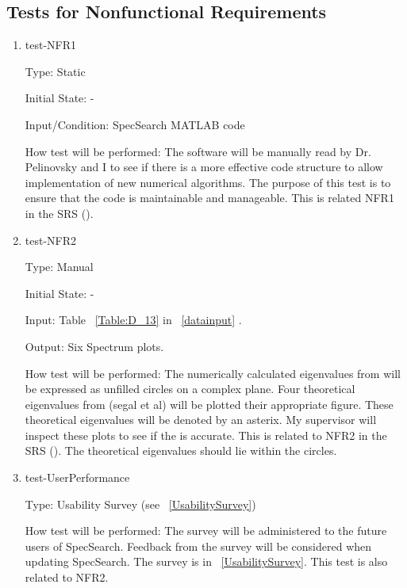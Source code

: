 \documentclass[12pt, titlepage]{article}
\begin{document}
\subsection{Tests for Nonfunctional Requirements}
\label{NFRtests}
\begin{enumerate}

\item{test-NFR1\\}

Type: Static
					
Initial State: -
					
Input/Condition: SpecSearch MATLAB code
					
How test will be performed: The software will be manually read by Dr. 
Pelinovsky and I to see if there is a more effective code structure to allow 
implementation of new numerical algorithms. The purpose of this test is to 
ensure that the code is maintainable and manageable. This is related NFR1 in 
the 
SRS (\cite{SRS}). 

\item{test-NFR2\\} 

Type: Manual 

Initial State: -

Input: Table ~\ref{Table:D_13} in ~\ref{datainput} .

Output: Six Spectrum plots.

How test will be performed: The numerically calculated eigenvalues from 
\progname will be expressed as unfilled circles on a complex plane. Four 
theoretical eigenvalues from (segal et al) will be plotted their appropriate 
figure. These theoretical eigenvalues will be denoted by an asterix. My 
supervisor will inspect these plots to see if the \progname is accurate. This 
is related to NFR2 in the SRS (\cite{SRS}). The theoretical eigenvalues should 
lie 
within the circles. \\ 

\item{test-UserPerformance\\} 

Type: Usability Survey (see ~\ref{UsabilitySurvey}) 

How test will be performed: The survey will be administered to the future users 
of SpecSearch. Feedback from the survey will be considered when updating 
SpecSearch. The survey is in ~\ref{UsabilitySurvey}. This test is also related 
to NFR2. 

\end{enumerate}
\end{document}
